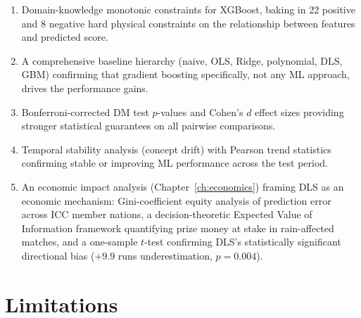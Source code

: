 \documentclass[12pt,a4paper,oneside]{report}
\begin{document}
\begin{enumerate}
    \item Domain-knowledge monotonic constraints for XGBoost, baking in 22 positive and 8 negative hard physical constraints on the relationship between features and predicted score.

    \item A comprehensive baseline hierarchy (naive, OLS, Ridge, polynomial, DLS, GBM) confirming that gradient boosting specifically, not any ML approach, drives the performance gains.

    \item Bonferroni-corrected DM test $p$-values and Cohen's $d$ effect sizes providing stronger statistical guarantees on all pairwise comparisons.

    \item Temporal stability analysis (concept drift) with Pearson trend statistics confirming stable or improving ML performance across the test period.

    \item An economic impact analysis (Chapter~\ref{ch:economics}) framing DLS as an economic mechanism: Gini-coefficient equity analysis of prediction error across ICC member nations, a decision-theoretic Expected Value of Information framework quantifying prize money at stake in rain-affected matches, and a one-sample $t$-test confirming DLS's statistically significant directional bias ($+9.9$ runs underestimation, $p=0.004$).
\end{enumerate}

\section{Limitations}
\end{document}
